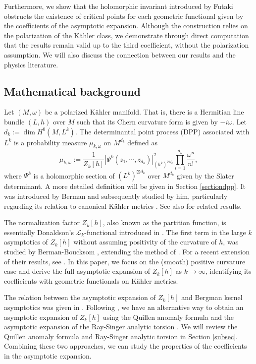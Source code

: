 \documentclass[12pt,reqno,a4paper]{amsart}
\numberwithin{equation}{section}
\theoremstyle{remark}
\theoremstyle{dotless}
\begin{document}
Furthermore, we show that the holomorphic invariant introduced by Futaki \cite{futaki2004asymptotic} obstructs the existence of critical points for each geometric functional given by the coefficients of the asymptotic expansion. Although the construction relies on the polarization of the K\"ahler class, we demonstrate through direct computation that the results remain valid up to the third coefficient, without the polarization assumption. We will also discuss the connection between our results and the physics literature.


\subsection{Mathematical background}

Let $(M,\omega)$ be a polarized K\"ahler manifold. That is, there is a Hermitian line bundle $(L,h)$ over $M$ such that its Chern curvature form is given by $-i\omega$. Let $d_k:=\dim H^0(M,L^k)$. The determinantal point process (DPP) associated with $L^k$ is a probability measure $\mu_{k,\omega}$ on $M^{d_k}$ defined as
\begin{equation*}
\mu_{k,\omega}:=\frac{1}{Z_k[h]}|\Psi^k(z_1,\cdots,z_{d_k})|^2_{(h^k)^{\boxtimes d_k}}\prod_{i=1}^{d_k}\frac{\omega^n}{n!},
\end{equation*}
where $\Psi^k$ is a holomorphic section of $(L^k)^{\boxtimes d_k}$ over $M^{d_k}$ given by the Slater determinant. A more detailed definition will be given in Section \ref{sectiondpp}. It was introduced by Berman and subsequently studied by him, particularly regarding its relation to canonical Kähler metrics \cite{berman2018kahler,berman2022measure,berman2024probabilistic}. See also \cite{fujita2016berman,fujita2018k,aoi2024microscopic} for related results. 

The normalization factor $Z_k[h]$, also known as the partition function, is essentially Donaldson's $\mathcal{L}_k$-functional introduced in \cite{donaldson2005scalar}. The first term in the large $k$ asymptotics of $Z_k[h]$ without assuming positivity of the curvature of $h$, was studied by Berman-Boucksom \cite{berman2010growth}, extending the method of \cite{donaldson2005scalar}. For a recent extension of their results, see \cite{finski2025small}. In this paper, we focus on the (smooth) positive curvature case and derive the full asymptotic expansion of $Z_k[h]$ as $k\rightarrow\infty$, identifying its coefficients with geometric functionals on K\"ahler metrics.

The relation between the asymptotic expansion of $Z_k[h]$ and Bergman kernel asymptotics was given in \cite{donaldson2005scalar}. Following \cite{klevtsov2017quantum,shen2025geometric}, we have an alternative way to obtain an asymptotic expansion of $Z_k[h]$ using the Quillen anomaly formula \cite{bismut1988analytic} and the asymptotic expansion of the Ray-Singer analytic torsion \cite{vasserot1989asymptotics,finski2018full}. We will review the Quillen anomaly formula and Ray-Singer analytic torsion in Section \ref{subsec}. Combining these two approaches, we can study the properties of the coefficients in the asymptotic expansion. 
\end{document}
